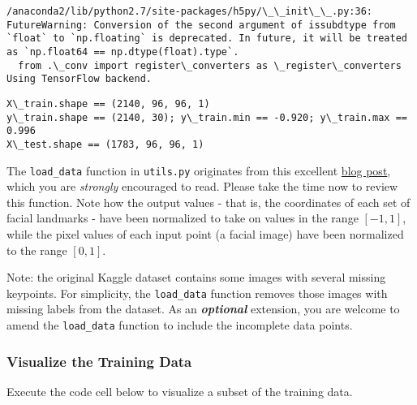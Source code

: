 \documentclass[11pt]{article}
\begin{document}
    \begin{Verbatim}[commandchars=\\\{\}]
/anaconda2/lib/python2.7/site-packages/h5py/\_\_init\_\_.py:36: FutureWarning: Conversion of the second argument of issubdtype from `float` to `np.floating` is deprecated. In future, it will be treated as `np.float64 == np.dtype(float).type`.
  from .\_conv import register\_converters as \_register\_converters
Using TensorFlow backend.

    \end{Verbatim}

    \begin{Verbatim}[commandchars=\\\{\}]
X\_train.shape == (2140, 96, 96, 1)
y\_train.shape == (2140, 30); y\_train.min == -0.920; y\_train.max == 0.996
X\_test.shape == (1783, 96, 96, 1)

    \end{Verbatim}

    The \texttt{load\_data} function in \texttt{utils.py} originates from
this excellent
\href{http://danielnouri.org/notes/2014/12/17/using-convolutional-neural-nets-to-detect-facial-keypoints-tutorial/}{blog
post}, which you are \emph{strongly} encouraged to read. Please take the
time now to review this function. Note how the output values - that is,
the coordinates of each set of facial landmarks - have been normalized
to take on values in the range \([-1, 1]\), while the pixel values of
each input point (a facial image) have been normalized to the range
\([0,1]\).

Note: the original Kaggle dataset contains some images with several
missing keypoints. For simplicity, the \texttt{load\_data} function
removes those images with missing labels from the dataset. As an
\textbf{\emph{optional}} extension, you are welcome to amend the
\texttt{load\_data} function to include the incomplete data points.

    \subsubsection{Visualize the Training
Data}\label{visualize-the-training-data}

Execute the code cell below to visualize a subset of the training data.
\end{document}

